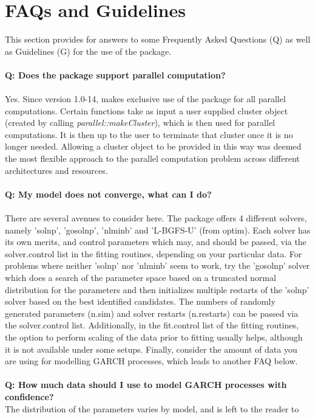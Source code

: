 \section{FAQs and Guidelines}\label{section:faqs}
This section provides for answers to some Frequently Asked Questions (Q) as well
as Guidelines (G) for the use of the \verb@rugarch@ package.\\
\\
\textbf{Q: Does the package support parallel computation?}\\
\\
Yes. Since version 1.0-14, \verb@rugarch@ makes exclusive use of the
\verb@parallel@ package for all parallel computations. Certain functions
take as input a user supplied cluster object (created by calling
\emph{parallel::makeCluster}), which is then used for parallel computations.
It is then up to the user to terminate that cluster once it is no longer
needed. Allowing a cluster object to be provided in this way was deemed the
most flexible approach to the parallel computation problem across different
architectures and resources.\\
\\
\textbf{Q: My model does not converge, what can I do?}\\
\\
There are several avenues to consider here. The package offers 4 different
solvers, namely 'solnp', 'gosolnp', 'nlminb' and 'L-BGFS-U' (from optim).
Each solver has its own merits, and control parameters which may, and should be
passed, via the solver.control list in the fitting routines, depending on your
particular data. For problems where neither 'solnp' nor 'nlminb' seem to work,
try the 'gosolnp' solver which does a search of the parameter space based on a
truncated normal distribution for the parameters and then initializes multiple
restarts of the 'solnp' solver based on the best identified candidates. The
numbers of randomly generated parameters (n.sim) and solver restarts (n.restarts)
can be passed via the solver.control list. Additionally, in the fit.control list
of the fitting routines, the option to perform scaling of the data prior to
fitting usually helps, although it is not available under some setups. Finally,
consider the amount of data you are using for modelling GARCH processes,
which leads to another FAQ below.\\
\\
\textbf{Q: How much data should I use to model GARCH processes with confidence?}\\
The distribution of the parameters varies by model, and is left to the reader to
